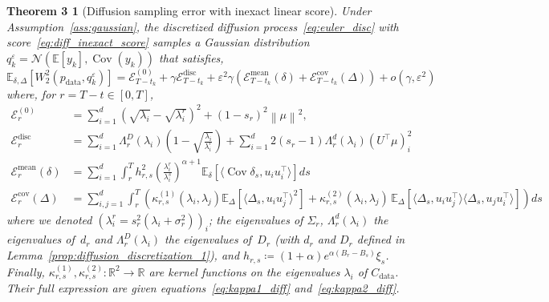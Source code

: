 \documentclass[11pt]{article}
\newcommand{\norm}[1]{\left\|{#1}\right\|}
\newcommand{\eqdef}{\coloneqq}
\newcommand{\EE}{\mathbb{E}}
\newcommand{\cov}{\operatorname{Cov}}
\begin{document}
\newtheorem*{repeatthm3}{Theorem 3}
\begin{repeatthm3}[Diffusion sampling error with inexact linear score] 
Under Assumption~\ref{ass:gaussian}, the discretized diffusion process~\eqref{eq:euler_disc} with score~\eqref{eq:diff_inexact_score} samples a Gaussian distribution ${q^\varepsilon_k = \mathcal{N}(\EE[y_{k}], \cov(y_k))}$ that satisfies, %
\begin{equation*}  
\EE_{\delta, \Delta}  \left[ W_2^2(p_\mathrm{data},q_k^\varepsilon) \right] =  \mathcal{E}^{(0)}_{T-t_k} + \gamma \mathcal{E}^{\text{disc}}_{T-t_k} + \varepsilon^2 \gamma \left( \mathcal{E}_{T-t_k}^{\text{mean}}(\delta) + \mathcal{E}_{T-t_k}^{\text{cov}}(\Delta) \right) + o(\gamma, \varepsilon^2)
\end{equation*}
where, for $r = T-t \in [0,T]$,
\begin{align*}
\mathcal{E}^{(0)}_{r} &=  \sum_{i=1}^d \left(\sqrt{\lambda_i} - \sqrt{\lambda^r_i}\right)^2 +  (1- s_{r})^2\norm{\mu}^2, \\
\mathcal{E}^{\text{disc}}_{r} &=  \sum_{i=1}^d \Lambda^{D}_{r}(\lambda_i) \left( 1 - \sqrt{\frac{\lambda_i}{\lambda^{r}_i}} \right)  + \sum_{i=1}^d 2 (s_{r}-1) \Lambda^{d}_{r}(\lambda_i)(U^\top \mu)^2_i\\
\mathcal{E}_{r}^{\text{mean}}(\delta)  &= \sum_{i=1}^d \int_{r}^{T} h_{r,s}^2 \left(\frac{\lambda_i^{r}}{\lambda_i^{s}}\right)^{\alpha+1} \EE_{\delta} \left[\langle \cov \delta_{s}, u_i u_i^\top \rangle\right]ds \\
\mathcal{E}_{r}^{\text{cov}}(\Delta)  &=  \sum_{i,j=1}^d  \int_{r}^{T} \! \!\left( \kappa^{(1)}_{r,s}(\lambda_i, \lambda_j)  \EE_{\Delta}\!\left[\langle \Delta_s, u_iu_j^\top \rangle^2\right]  + \!\kappa^{(2)}_{r,s}(\lambda_i, \lambda_j) \, \EE_{\Delta}\!\left[\langle \Delta_s, u_iu_j^\top \rangle \langle \Delta_s, u_ju_i^\top \rangle \right] \right) ds
\end{align*}
where we denoted $\left(\lambda^r_i = s_r^2 (\lambda_i + \sigma_r^2)\right)_i$; the eigenvalues of $\Sigma_r$, $\Lambda^{d}_{r}(\lambda_i)$ the eigenvalues of~$d_r$ and $\Lambda^{D}_{r}(\lambda_i)$ the eigenvalues of~$D_r$ (with $d_r$ and $D_r$ defined in Lemma~\ref{prop:diffusion_discretization_1}), 
and $h_{r,s} \eqdef (1+\alpha) e^{\alpha (B_{r}-B_s)} \xi_{s}$.
Finally,  \( \kappa^{(1)}_{r,s}, \kappa^{(2)}_{r,s} : \mathbb{R}^2 \to \mathbb{R} \) are kernel functions on the eigenvalues \( \lambda_i \) of \( C_\mathrm{data} \). Their full expression are given equations~\eqref{eq:kappa1_diff} and~\eqref{eq:kappa2_diff}.
\end{repeatthm3} 
\end{document}
